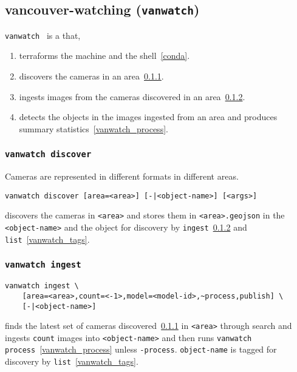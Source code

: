 \subsection{vancouver-watching (\texttt{vanwatch})}\label{vanwatch}

\texttt{vanwatch}~ is a  that,
%
\begin{enumerate}
    \item{terraforms the machine and the shell~\ref{conda}.}
    \item{discovers the cameras in an area~\ref{vanwatch_discover}.}
    \item{ingests images from the cameras discovered in an area~\ref{vanwatch_ingest}.}
    \item{detects the objects in the images ingested from an area and produces summary statistics~\ref{vanwatch_process}.}
\end{enumerate}

\subsubsection{\texttt{vanwatch discover}}\label{vanwatch_discover}

Cameras are represented in different formats in different areas.
%
\begin{verbatim}
vanwatch discover [area=<area>] [-|<object-name>] [<args>]
\end{verbatim}
%
discovers the cameras in \texttt{<area>} and stores them in \texttt{<area>.geojson} in the  \texttt{<object-name>} and  the object for discovery by \texttt{ingest}~\ref{vanwatch_ingest} and \texttt{list}~\ref{vanwatch_tags}. 

\subsubsection{\texttt{vanwatch ingest}}\label{vanwatch_ingest}

\begin{verbatim}
vanwatch ingest \
    [area=<area>,count=<-1>,model=<model-id>,~process,publish] \
    [-|<object-name>]
\end{verbatim}
%
finds the latest set of cameras discovered~\ref{vanwatch_discover} in \texttt{<area>} through  search and ingests \texttt{count} images into \texttt{<object-name>} and then runs \texttt{vanwatch process}~\ref{vanwatch_process} unless \texttt{-process}. \texttt{object-name} is tagged for discovery by \texttt{list}~\ref{vanwatch_tags}. 

